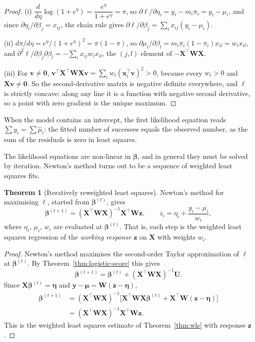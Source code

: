 \documentclass[11pt,a4paper]{article}
\numberwithin{equation}{section}
\theoremstyle{definition}
\newtheorem{thm}{Theorem}[subsection]
\begin{document}
\begin{proof}
(i) $\dfrac{d}{d\eta}\log(1 + e^{\eta}) = \dfrac{e^{\eta}}{1 + e^{\eta}} = \pi$, so $\partial\ell/\partial\eta_i = y_i - m_i\pi_i = y_i - \mu_i$, and since
$\partial\eta_i/\partial\beta_j = x_{ij}$, the chain rule gives $\partial\ell/\partial\beta_j = \sum_i x_{ij}(y_i - \mu_i)$.

(ii) $d\pi/d\eta = e^{\eta}/(1 + e^{\eta})^2 = \pi(1 - \pi)$, so $\partial\mu_i/\partial\beta_l = m_i\pi_i(1 - \pi_i)x_{il} = w_ix_{il}$, and
$\partial^2\ell/\partial\beta_j\partial\beta_l = -\sum_i x_{ij}w_ix_{il}$, the $(j, l)$ element of $-\mathbf{X}^\top\mathbf{WX}$.

(iii) For $\mathbf{v} \ne \mathbf{0}$, $\mathbf{v}^\top\mathbf{X}^\top\mathbf{WXv} = \sum_i w_i(\mathbf{x}_i^\top\mathbf{v})^2 > 0$, because every $w_i > 0$ and $\mathbf{Xv} \ne \mathbf{0}$. So the
second-derivative matrix is negative definite everywhere, and $\ell$ is strictly concave: along any line it is
a function with negative second derivative, so a point with zero gradient is the unique maximum.
\end{proof}

When the model contains an intercept, the first likelihood equation reads $\sum y_i = \sum\hat\mu_i$: the fitted
number of successes equals the observed number, as the sum of the residuals is zero in least squares.

The likelihood equations are non-linear in $\boldsymbol\beta$, and in general they must be solved by iteration.
Newton's method turns out to be a sequence of weighted least squares fits.

\begin{thm}[Iteratively reweighted least squares]\label{thm:irls-logistic}
Newton's method for maximising $\ell$, started from $\boldsymbol\beta^{(t)}$, gives
\[
\boldsymbol\beta^{(t+1)} = (\mathbf{X}^\top\mathbf{WX})^{-1}\mathbf{X}^\top\mathbf{Wz} ,
\qquad z_i = \eta_i + \frac{y_i - \mu_i}{w_i} ,
\]
where $\eta_i$, $\mu_i$, $w_i$ are evaluated at $\boldsymbol\beta^{(t)}$. That is, each step is the weighted least squares
regression of the \emph{working response} $\mathbf{z}$ on $\mathbf{X}$ with weights $w_i$.
\end{thm}

\begin{proof}
Newton's method maximises the second-order Taylor approximation of $\ell$ at
$\boldsymbol\beta^{(t)}$. By Theorem~\ref{thm:logistic-score} this gives
\[
\boldsymbol\beta^{(t+1)} = \boldsymbol\beta^{(t)} + (\mathbf{X}^\top\mathbf{WX})^{-1}\mathbf{U} .
\]
Since
$\mathbf{X}\boldsymbol\beta^{(t)} = \boldsymbol\eta$ and $\mathbf{y} - \boldsymbol\mu = \mathbf{W}(\mathbf{z} - \boldsymbol\eta)$,
\begin{align*}
\boldsymbol\beta^{(t+1)} &= (\mathbf{X}^\top\mathbf{WX})^{-1}\bigl[\mathbf{X}^\top\mathbf{WX}\boldsymbol\beta^{(t)} + \mathbf{X}^\top\mathbf{W}(\mathbf{z} - \boldsymbol\eta)\bigr] \\
&= (\mathbf{X}^\top\mathbf{WX})^{-1}\mathbf{X}^\top\mathbf{Wz} .
\end{align*}
This is the weighted least squares estimate of Theorem~\ref{thm:wls} with response $\mathbf{z}$.
\end{proof}
\end{document}

